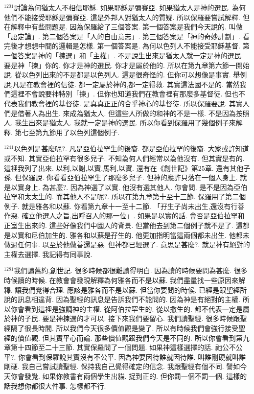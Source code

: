 \documentclass{book}
\begin{document}
$^{1201}$討論為何猶太人不相信耶穌.
如果耶穌是彌賽亞.
如果猶太人是神的選民.
為何他們不能接受耶穌是彌賽亞.
這是外邦人對猶太人的質疑.
所以保羅要嘗試解釋.
但在解釋中有些問題是.
因為保羅給了三個答案.
第一個答案是我們今天說的.
叫做「語定論」.
第二個答案是「人的自由意志」.
第三個答案是「神的奇妙計劃」.
看完後才想想中間的邏輯是怎樣.
第一個答案是.
為何以色列人不能接受耶穌基督.
第一個答案是神的「揀選」和「主權」.
不是說生出來是猶太人就一定是神的選民.
要是神「揀」你的.
你才是神的選民.
你才是屬於他的.
所以在第九章第六節一開始說.
從以色列出來的不是都是以色列人.
這是很奇怪的.
但你可以想像是事實.
舉例說,凡是在教會裡的信徒.
都一定屬於神的,都一定得救.
其實這法國不是的.
當然我們這裡不會說要神特別「揀」.
但你也知道我們在教會裡有那麼多基督徒.
但也不代表我們教會裡的基督徒.
是真真正正的合乎神心的基督徒.
所以保羅要說.
其實人們是借著人為出生.
來成為猶太人.
但這些人所做的和神的不是一樣.
不是因為按照人.
我生出來是猶太人.
我就一定是神的選民.
所以你看到保羅用了幾個例子來解釋.
第七至第九節用了以色列這個例子.

$^{1241}$以色列是甚麼呢?.
凡是亞伯拉罕生的後裔.
都是亞伯拉罕的後裔.
大家或許知道或不知.
其實亞伯拉罕有很多兒子.
不知為何人們經常以為他沒有.
但其實是有的.
這裡我列了出來.
以利,以謝,以實,馬利,以實.
還有在《創世記》第25章.
還有其他子孫.
但保羅說.
你看看亞伯拉罕生了那麼多兒子.
但神的應許只落在一個人身上.
就是以實身上.
為甚麼?.
因為神選了以實.
他沒有選其他人.
你會問.
是不是因為亞伯拉罕和太太生的.
而其他人不是呢?.
所以在第九章第十至十三節.
保羅用了第二個例子.
就是雅各和以蘇.
你看第九章十一至十二節.
「孖生子尚未出生,還沒有行善作惡.
確立他選人之旨,出呼召人的那一位」.
如果是以實的話.
會否是亞伯拉罕和正室生出來的.
這些好像我們中國人的背景.
但當他去到第二個例子就不是了.
這都是以實和尼伯加生的.
雅各和以蘇是孖生的.
他更加指明當這兩個都未出生.
他都未做過任何事.
以至於他做善還是惡.
但神都已經選了.
意思是甚麼?.
就是神有絕對的主權去選擇.
我記得有同事說.

$^{1281}$我們讀舊約,創世記.
很多時候都很難讀得明白.
因為讀的時候要問為甚麼.
很多時候讀的時候.
在教會會發現解釋為何雅各而不是以蘇.
我們盡量找一些原因來解釋.
讓我們覺得合理.
應該是雅各而不是以蘇.
但當你要問的時候.
已經是跟聖經所說的訊息相違背.
因為聖經的訊息是告訴我們不能問的.
因為神是有絕對的主權.
所以你會看到這裡是強調神的主權.
從阿伯拉罕生的.
從以撒生的.
都不代表一定是屬於神的子民.
要是神揀選的才可以.
接下來我們要留心.
我們讀聖經.
很多時候跟聖經隔了很長時間.
所以我們今天很多價值觀是變了.
所以有時候我們會強行接受聖經的價值觀.
但其實平心而論.
那些價值觀跟我們今天是不同的.
所以你會看到第九章第十四節至二十三節.
其實保羅問了一個問題.
如果神這樣選擇的話.
祂公不公平?.
你會看到保羅說其實沒有不公平.
因為神要因待誰就因待誰.
叫誰剛硬就叫誰剛硬.
我自己嘗試讀聖經.
保持我自己覺得確定的信念.
我跟聖經有個不同.
譬如今天你會發覺.
如果你教書有兩個學生出貓.
捉到正的.
但你罰一個不罰一個.
這樣的話我想你都很大件事.
怎樣都不行.
\end{document}
